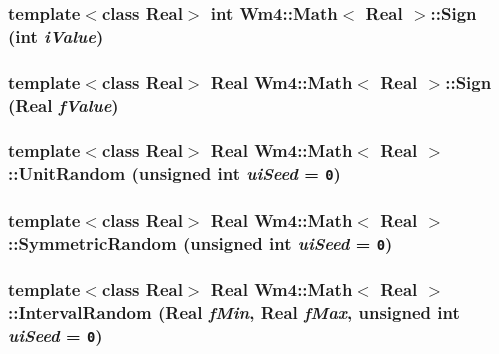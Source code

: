 \subsubsection{\setlength{\rightskip}{0pt plus 5cm}template$<$class Real$>$ int {\bf Wm4::Math}$<$ Real $>$::Sign (int {\em i\-Value})\hspace{0.3cm}{\tt  [static]}}\label{classWm4_1_1Math_2fb693eb53ba1b2643305c8f50b0d747}


\subsubsection{\setlength{\rightskip}{0pt plus 5cm}template$<$class Real$>$ Real {\bf Wm4::Math}$<$ Real $>$::Sign (Real {\em f\-Value})\hspace{0.3cm}{\tt  [static]}}\label{classWm4_1_1Math_1c85feb0b08de9215a49a6e1c34504ff}


\subsubsection{\setlength{\rightskip}{0pt plus 5cm}template$<$class Real$>$ Real {\bf Wm4::Math}$<$ Real $>$::Unit\-Random (unsigned int {\em ui\-Seed} = {\tt 0})\hspace{0.3cm}{\tt  [static]}}\label{classWm4_1_1Math_87baf2aa4f385477216614d478d99a43}


\subsubsection{\setlength{\rightskip}{0pt plus 5cm}template$<$class Real$>$ Real {\bf Wm4::Math}$<$ Real $>$::Symmetric\-Random (unsigned int {\em ui\-Seed} = {\tt 0})\hspace{0.3cm}{\tt  [static]}}\label{classWm4_1_1Math_3ccd8e5bce7153bf90e85c21cd943d9e}


\subsubsection{\setlength{\rightskip}{0pt plus 5cm}template$<$class Real$>$ Real {\bf Wm4::Math}$<$ Real $>$::Interval\-Random (Real {\em f\-Min}, Real {\em f\-Max}, unsigned int {\em ui\-Seed} = {\tt 0})\hspace{0.3cm}{\tt  [static]}}\label{classWm4_1_1Math_15447b36fcec0d09a39691e17878c9af}


